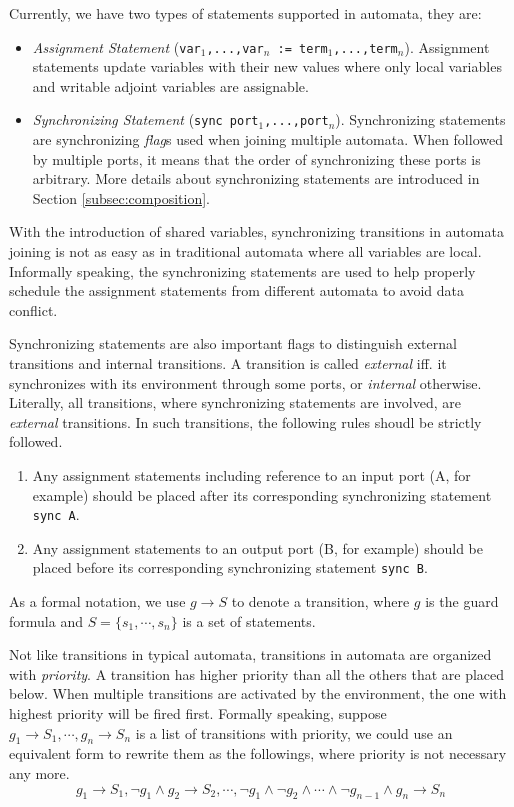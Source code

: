 Currently, we have two types of statements supported in automata, they are:
\begin{itemize}
    \item \emph{Assignment Statement} (\texttt{var$_1$,...,var$_n$ := term$_1$,...,term$_n$}). Assignment statements update variables with their new values where only local variables and writable adjoint variables are assignable.
    \item \emph{Synchronizing Statement} (\texttt{sync port$_1$,...,port$_n$}). Synchronizing statements are synchronizing \emph{flag}s used when joining multiple automata. When followed by multiple ports, it means that the order of synchronizing these ports is arbitrary. More details about synchronizing statements are introduced in Section \ref{subsec:composition}.
\end{itemize}

With the introduction of shared variables, synchronizing transitions in automata joining is not as easy as in traditional automata where all variables are local. Informally speaking, the synchronizing statements are used to help properly schedule the assignment statements from different automata to avoid data conflict.

Synchronizing statements are also important flags to distinguish external transitions and internal transitions. A transition is called \emph{external} iff. it synchronizes with its environment through some ports, or \emph{internal} otherwise. Literally, all transitions, where synchronizing statements are involved, are \emph{external} transitions. In such transitions, the following rules shoudl be strictly followed.

\begin{enumerate}
    \item Any assignment statements including reference to an input port (A, for example) should be placed after its corresponding synchronizing statement \texttt{sync A}.
    \item Any assignment statements to an output port (B, for example) should be placed before its corresponding synchronizing statement \texttt{sync B}.
\end{enumerate}


As a formal notation, we use $g\rightarrow S$ to denote a transition, where $g$ is the guard formula and $S=\{s_1,\cdots,s_n\}$ is a set of statements. 

Not like transitions in typical automata, transitions in \lang{} automata are organized with \emph{priority}. A transition has higher priority than all the others that are placed below. When multiple transitions are activated by the environment, the one with highest priority will be fired first. Formally speaking, suppose $g_1\rightarrow S_1,\cdots,g_n\rightarrow S_n$ is a list of transitions with priority, we could use an equivalent form to rewrite them as the followings, where priority is not necessary any more.
\[
    g_1\rightarrow S_1, \lnot g_1\land g_2\rightarrow S_2,\cdots,\lnot g_1\land \lnot g_2\land\cdots\land \lnot g_{n-1} \land g_n\rightarrow S_n
\]

